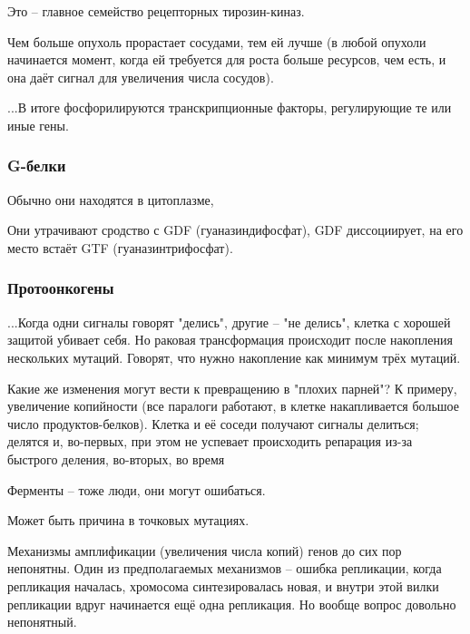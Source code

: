 \documentclass[main.tex]{subfiles}
\begin{document}
Это -- главное семейство рецепторных тирозин-киназ.

Чем больше опухоль прорастает сосудами, тем ей лучше (в любой опухоли начинается момент, когда ей требуется для роста больше ресурсов, чем есть, и она даёт сигнал для увеличения числа сосудов).


...В итоге фосфорилируются транскрипционные факторы, регулирующие те или иные гены.

\subsubsection{G-белки}

Обычно они находятся в цитоплазме,  %

Они утрачивают сродство с GDF (гуаназиндифосфат), GDF диссоциирует, на его место встаёт  GTF (гуаназинтрифосфат).


\subsubsection{Протоонкогены} 

...Когда одни сигналы говорят "делись", другие -- "не делись", клетка с хорошей защитой убивает себя.
Но раковая трансформация происходит после накопления нескольких мутаций.
Говорят, что нужно накопление как минимум трёх мутаций.

Какие же изменения могут вести к превращению в "плохих парней"?
К примеру, увеличение копийности (все паралоги работают, в клетке накапливается большое число продуктов-белков).
Клетка и её соседи получают сигналы делиться; делятся и, во-первых, при этом не успевает происходить репарация из-за быстрого деления, во-вторых, во время   %

\begin{leftbar}
	Ферменты -- тоже люди, они могут ошибаться.
\end{leftbar}

Может быть причина в точковых мутациях.


Механизмы амплификации (увеличения числа копий) генов до сих пор непонятны.
Один из предполагаемых механизмов -- ошибка репликации, когда репликация началась, хромосома синтезировалась новая, и внутри этой вилки репликации вдруг начинается ещё одна репликация.
Но вообще вопрос довольно непонятный.
\end{document}
